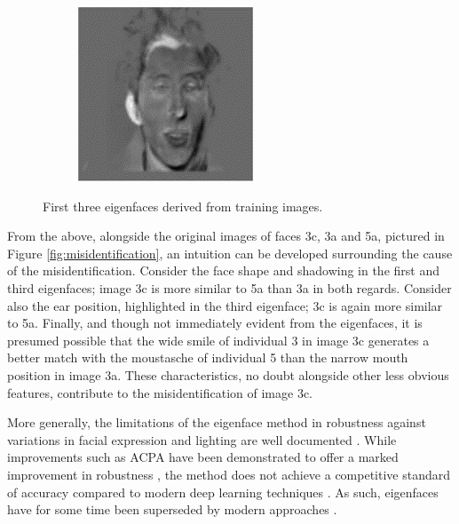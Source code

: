 \begin{figure}[ht]
\begin{subfigure}[b]{0.2\textwidth}
  \end{subfigure}
  \hspace{2em}
  \begin{subfigure}[b]{0.2\textwidth}
    \centering
    \includegraphics[width=\textwidth]{images/q3_eigenface_res3.png}
  \end{subfigure}
  \caption{First three eigenfaces derived from training images.}
  \label{fig:eigenfaces_res}
\end{figure}

From the above, alongside the original images of faces 3c, 3a and 5a, pictured in Figure \ref{fig:misidentification}, an intuition can be developed surrounding the cause of the misidentification. Consider the face shape and shadowing in the first and third eigenfaces; image 3c is more similar to 5a than 3a in both regards. Consider also the ear position, highlighted in the third eigenface; 3c is again more similar to 5a. Finally, and though not immediately evident from the eigenfaces, it is presumed possible that the wide smile of individual 3 in image 3c generates a better match with the moustasche of individual 5 than the narrow mouth position in image 3a. These characteristics, no doubt alongside other less obvious features, contribute to the misidentification of image 3c.

More generally, the limitations of the eigenface method in robustness against variations in facial expression and lighting are well documented \cite{lovell_2008}. While improvements such as ACPA have been demonstrated to offer a marked improvement in robustness \cite{lovell_2008}, the method does not achieve a competitive standard of accuracy compared to modern deep learning techniques \cite{benito_2017}. As such, eigenfaces have for some time been superseded by modern approaches \cite{elec4630_2023}.

